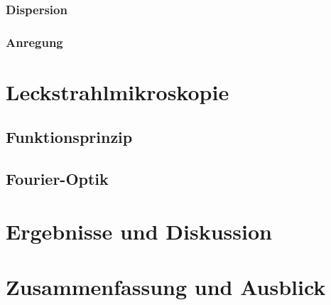 \documentclass{article}
\begin{document}
\subsubsection{Dispersion}
\subsubsection{Anregung}
\section{Leckstrahlmikroskopie}
\subsection{Funktionsprinzip}
\subsection{Fourier-Optik}

\section{Ergebnisse und Diskussion}
\section{Zusammenfassung und Ausblick}
	
	
	
\end{document}
